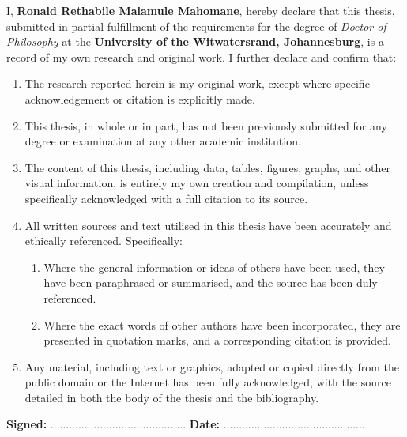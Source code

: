 
\noindent I, \textbf{Ronald Rethabile Malamule Mahomane}, hereby declare that this thesis, submitted in partial fulfillment of the requirements for the degree of \textit{Doctor of Philosophy} at the \textbf{University of the Witwatersrand, Johannesburg}, is a record of my own research and original work. I further declare and confirm that:

\begin{enumerate}
\item The research reported herein is my original work, except where specific acknowledgement or citation is explicitly made.

\item This thesis, in whole or in part, has not been previously submitted for any degree or examination at any other academic institution.

\item The content of this thesis, including data, tables, figures, graphs, and other visual information, is entirely my own creation and compilation, unless specifically acknowledged with a full citation to its source.

\item All written sources and text utilised in this thesis have been accurately and ethically referenced. Specifically:
\begin{enumerate}
\item Where the general information or ideas of others have been used, they have been paraphrased or summarised, and the source has been duly referenced.
\item Where the exact words of other authors have been incorporated, they are presented in quotation marks, and a corresponding citation is provided.
\end{enumerate}
\item Any material, including text or graphics, adapted or copied directly from the public domain or the Internet has been fully acknowledged, with the source detailed in both the body of the thesis and the bibliography.
\end{enumerate}

\vspace{0.5cm}
\noindent \textbf{Signed:} ............................................ \hfill \textbf{Date:} ..............................................

\clearpage